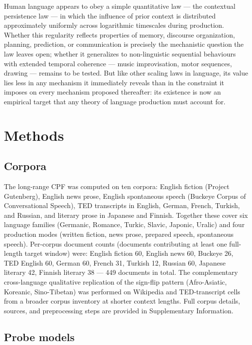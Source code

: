 \documentclass[11pt]{article}
\begin{document}
Human language appears to obey a simple quantitative law --- the contextual
persistence law --- in which the influence of prior context is distributed approximately
uniformly across logarithmic timescales during production. Whether this regularity reflects
properties of memory, discourse organization, planning, prediction, or communication is
precisely the mechanistic question the law leaves open; whether it generalizes
to non-linguistic sequential behaviours with extended temporal coherence --- music improvisation,
motor sequences, drawing --- remains to be tested. But like other scaling laws in language, its
value lies less in any mechanism it immediately reveals than in the constraint it imposes on
every mechanism proposed thereafter: its existence is now an empirical target that any theory of
language production must account for.

\section{Methods}

\subsection{Corpora}

The long-range CPF was computed on ten corpora: English fiction (Project
Gutenberg), English news prose, English spontaneous speech (Buckeye Corpus of Conversational
Speech), TED transcripts in English, German, French, Turkish, and Russian, and literary prose
in Japanese and Finnish. Together these cover six language families (Germanic, Romance, Turkic,
Slavic, Japonic, Uralic) and four production modes (written fiction, news prose, prepared
speech, spontaneous speech). Per-corpus document counts (documents contributing at least one
full-length target window) were: English fiction 60, English news 60, Buckeye 26, TED English 60,
German 60, French 31, Turkish 12, Russian 60, Japanese literary 42, Finnish literary 38 --- 449
documents in total. The complementary cross-language qualitative replication of the sign-flip
pattern (Afro-Asiatic, Koreanic, Sino-Tibetan) was performed on Wikipedia and TED-transcript cells
from a broader corpus inventory at shorter context lengths. Full corpus details, sources, and
preprocessing steps are provided in Supplementary Information.

\subsection{Probe models}
\end{document}
